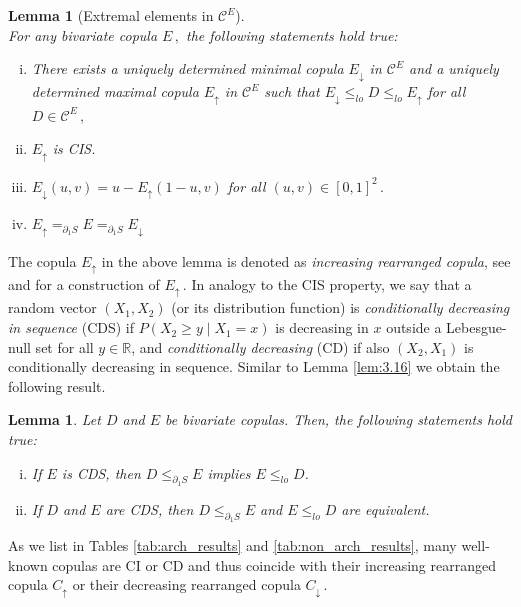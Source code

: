 \documentclass{article}
\newtheorem{lemma}[theorem]{Lemma}
\newcommand{\R}{\mathbb{R}}
\newcommand{\cC}{\mathcal{C}}
\begin{document}
\begin{lemma}[Extremal elements in \(\cC^E\)]\label{lem:extremal_elements}~\\
    For any bivariate copula \(E\,,\) the following statements hold true:
    \begin{enumerate}[(i)]
        \item There exists a uniquely determined minimal copula \(E_\downarrow\) in \(\cC^E\) and a uniquely determined maximal copula \(E_\uparrow\) in \(\cC^E\) such that \(E_\downarrow \leq_{lo} D \leq_{lo} E_\uparrow\) for all \(D\in \cC^E\,,\)
        \item \(E_\uparrow\) is CIS.
        \item \(E_\downarrow(u,v) = u - E_\uparrow(1-u,v)\) for all \((u,v)\in [0,1]^2\,.\)
        \item \(E_\uparrow=_{\partial_1 S} E =_{\partial_1 S} E_\downarrow\)
    \end{enumerate}
\end{lemma}

The copula \(E_\uparrow\) in the above lemma is denoted as \emph{increasing rearranged copula}, see \cite[Proof of Proposition 3.17]{Ansari-Rueschendorf-2021} and \cite{strothmann2022rearranged} for a construction of \(E_\uparrow\,.\)
In analogy to the CIS property, we say that a random vector $(X_1, X_2)$ (or its distribution function) is \emph{conditionally decreasing in sequence} (CDS) if \(P(X_2\geq y\mid X_1 =x)\) is decreasing in \(x\) outside a Lebesgue-null set for all \(y\in \R\), and \emph{conditionally decreasing} (CD) if also $(X_2, X_1)$ is conditionally decreasing in sequence.
Similar to Lemma \ref{lem:3.16} we obtain the following result.
\begin{lemma}\label{lem:3.16_cds}
    Let $D$ and $E$ be bivariate copulas.
    Then, the following statements hold true: 
    \begin{enumerate}[(i)]
        \item If $E$ is CDS, then $D\leq_{\partial_1 S} E$ implies $E\leq_{lo} D$.
        \item If $D$ and $E$ are CDS, then $D\leq_{\partial_1 S} E$ and $E\leq_{lo}D$ are equivalent.
    \end{enumerate}
\end{lemma}

As we list in Tables \ref{tab:arch_results} and \ref{tab:non_arch_results}, many well-known copulas are CI or CD and thus coincide with their increasing rearranged copula \(C_\uparrow\) or their decreasing rearranged copula \(C_{\downarrow}\,.\)
\end{document}
